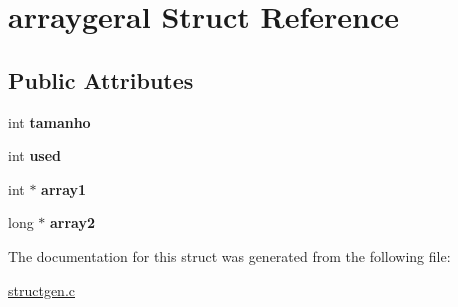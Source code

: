 \hypertarget{structarraygeral}{}\section{arraygeral Struct Reference}
\label{structarraygeral}
\subsection*{Public Attributes}
\begin{DoxyCompactItemize}
\item 
int {\bfseries tamanho}\hypertarget{structarraygeral_af75be559bb358442fca963e3452713df}{}\label{structarraygeral_af75be559bb358442fca963e3452713df}

\item 
int {\bfseries used}\hypertarget{structarraygeral_a9fa793ad6ed79cb77d2f6425f6fb3f76}{}\label{structarraygeral_a9fa793ad6ed79cb77d2f6425f6fb3f76}

\item 
int $\ast$ {\bfseries array1}\hypertarget{structarraygeral_a6e8870ac9e05b66d7efd021c3e49177f}{}\label{structarraygeral_a6e8870ac9e05b66d7efd021c3e49177f}

\item 
long $\ast$ {\bfseries array2}\hypertarget{structarraygeral_a6bd29d0ecb03b1e42cf0f3516e894a38}{}\label{structarraygeral_a6bd29d0ecb03b1e42cf0f3516e894a38}

\end{DoxyCompactItemize}


The documentation for this struct was generated from the following file\+:\begin{DoxyCompactItemize}
\item 
\hyperlink{structgen_8c}{structgen.\+c}\end{DoxyCompactItemize}
